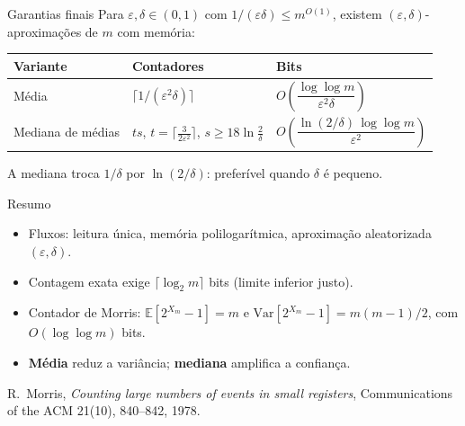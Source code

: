 \documentclass[aspectratio=169,10pt]{beamer}
\newcommand{\teto}[1]{\lceil #1\rceil}
\newcommand{\E}[1]{\mathbb{E}\!\left[#1\right]}
\newcommand{\Var}[1]{\mathrm{Var}\!\left[#1\right]}
\newcommand{\paren}[1]{\left(#1\right)}
\begin{document}
\begin{frame}{Garantias finais}
  Para $\varepsilon,\delta\in(0,1)$ com $1/(\varepsilon\delta)\leq m^{O(1)}$,
  existem $(\varepsilon,\delta)$-aproximações de $m$ com memória:
  \medskip
  \begin{center}
    \begin{tabular}{lll}
      \toprule
      Variante & Contadores & Bits \\
      \midrule
      Média & $\teto{1/(\varepsilon^2\delta)}$ &
        $O\paren{\dfrac{\log\log m}{\varepsilon^2\delta}}$ \\[8pt]
      Mediana de médias & $ts$, $t=\teto{\tfrac3{2\varepsilon^2}}$,
        $s\geq18\ln\tfrac2\delta$ &
        $O\paren{\dfrac{\ln(2/\delta)\,\log\log m}{\varepsilon^2}}$ \\
      \bottomrule
    \end{tabular}
  \end{center}
  \medskip
  A mediana troca $1/\delta$ por $\ln(2/\delta)$: preferível quando
  $\delta$ é pequeno.
\end{frame}

\begin{frame}{Resumo}
  \begin{itemize}
  \item Fluxos: leitura única, memória polilogarítmica, aproximação
    aleatorizada $(\varepsilon,\delta)$.
  \item Contagem exata exige $\teto{\log_2 m}$ bits (limite inferior
    justo).
  \item Contador de Morris: $\E{2^{X_m}-1}=m$ e
    $\Var{2^{X_m}-1}=m(m-1)/2$, com $O(\log\log m)$ bits.
  \item \textbf{Média} reduz a variância; \textbf{mediana} amplifica a
    confiança.
  \end{itemize}
  \medskip
  \small R.~Morris, \textit{Counting large numbers of events in small
    registers}, Communications of the ACM 21(10), 840--842, 1978.
\end{frame}
\end{document}
